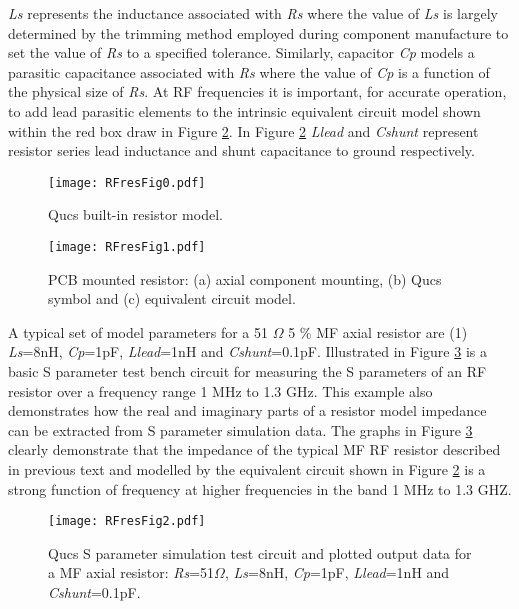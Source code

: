 \textit{Ls} represents the inductance associated with \textit{Rs} where the value of \textit{Ls} is largely determined by the trimming method employed during component manufacture
to set the value of \textit{Rs} to a specified tolerance.
Similarly, capacitor \textit{Cp} models a parasitic capacitance associated with \textit{Rs} where the value of \textit{Cp} is a function of the physical size of \textit{Rs}.
At RF frequencies it is important, for accurate operation, to add lead parasitic elements to the intrinsic equivalent circuit model shown within the red box draw in Figure \ref{RFresFig1}.
In Figure \ref{RFresFig1} \textit{Llead} and \textit{Cshunt} represent resistor series lead inductance and shunt capacitance to ground respectively.
\begin{figure}[ht]
\begin{center}
	\texttt{[image: RFresFig0.pdf]}
	\caption{Qucs built-in resistor model.}
	\label{RFresFig0}
\end{center}
\end{figure}
\begin{figure}[ht]
\begin{center}
	\texttt{[image: RFresFig1.pdf]}
	\caption{PCB mounted resistor: (a) axial component mounting, (b) Qucs symbol and (c) equivalent circuit model.}
	\label{RFresFig1}
\end{center}
\end{figure}
A typical set of model parameters for a  51 $\Omega$  5 \% MF axial resistor are (1) \textit{Ls}=8nH, \textit{Cp}=1pF, \textit{Llead}=1nH and \textit{Cshunt}=0.1pF.
Illustrated in Figure \ref{RFresFig2} is a basic S parameter test bench circuit for measuring the S parameters of an RF resistor over a frequency range 1 MHz to
1.3 GHz. This example also demonstrates how the real and imaginary parts of a resistor model impedance can be extracted from S parameter simulation data.
The graphs in Figure \ref{RFresFig2} clearly demonstrate that the impedance of the typical MF RF resistor described in previous text and modelled by the
equivalent circuit shown in Figure \ref{RFresFig1} is a strong function of frequency at higher frequencies in the band 1 MHz to 1.3 GHZ.
\begin{figure}[ht]
\begin{center}
	\texttt{[image: RFresFig2.pdf]}
	\caption{Qucs S parameter simulation test circuit and plotted output data for a MF axial resistor: \textit{Rs}=51$\Omega$, \textit{Ls}=8nH, \textit{Cp}=1pF, \textit{Llead}=1nH and \textit{Cshunt}=0.1pF.   }
	\label{RFresFig2}
\end{center}
\end{figure}
